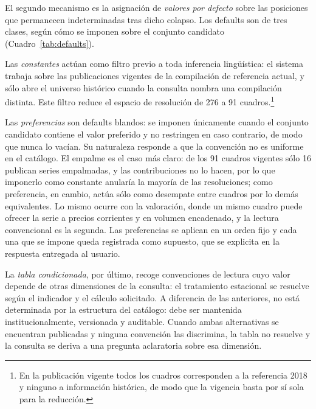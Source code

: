 \documentclass[11pt]{article}
\begin{document}
El segundo mecanismo es la asignación de \emph{valores por defecto} sobre las
posiciones que permanecen indeterminadas tras dicho colapso. Los defaults son
de tres clases, según cómo se imponen sobre el conjunto candidato
(Cuadro~\ref{tab:defaults}).

Las \emph{constantes} actúan como filtro previo a toda inferencia lingüística:
el sistema trabaja sobre las publicaciones vigentes de la compilación de
referencia actual, y sólo abre el universo histórico cuando la consulta nombra
una compilación distinta. Este filtro reduce el espacio de resolución de 276 a
91 cuadros.\footnote{En la publicación vigente todos los cuadros corresponden a
la referencia 2018 y ninguno a información histórica, de modo que la vigencia
basta por sí sola para la reducción.}

Las \emph{preferencias} son defaults blandos: se imponen únicamente cuando el
conjunto candidato contiene el valor preferido y no restringen en caso
contrario, de modo que nunca lo vacían. Su naturaleza responde a que la
convención no es uniforme en el catálogo. El empalme es el caso más claro: de
los 91 cuadros vigentes sólo 16 publican series empalmadas, y las contribuciones
no lo hacen, por lo que imponerlo como constante anularía la mayoría de las
resoluciones; como preferencia, en cambio, actúa sólo como desempate entre
cuadros por lo demás equivalentes. Lo mismo ocurre con la valoración, donde un
mismo cuadro puede ofrecer la serie a precios corrientes y en volumen encadenado,
y la lectura convencional es la segunda. Las preferencias se aplican en un orden
fijo y cada una que se impone queda registrada como supuesto, que se explicita en
la respuesta entregada al usuario.

La \emph{tabla condicionada}, por último, recoge convenciones de lectura cuyo
valor depende de otras dimensiones de la consulta: el tratamiento estacional se
resuelve según el indicador y el cálculo solicitado. A diferencia de las
anteriores, no está determinada por la estructura del catálogo: debe ser
mantenida institucionalmente, versionada y auditable. Cuando ambas alternativas
se encuentran publicadas y ninguna convención las discrimina, la tabla no
resuelve y la consulta se deriva a una pregunta aclaratoria sobre esa dimensión.
\end{document}
